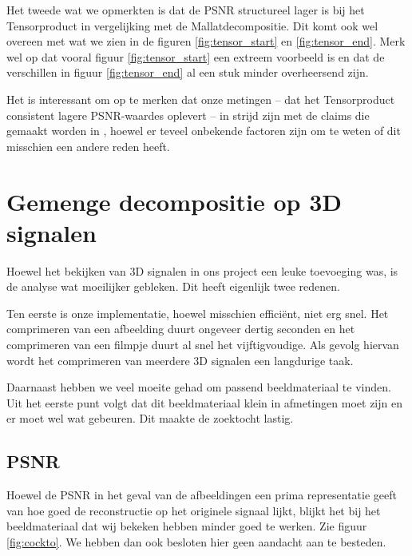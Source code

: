 Het tweede wat we opmerkten is dat de PSNR structureel lager is bij het Tensorproduct in vergelijking met de Mallatdecompositie. Dit komt ook wel overeen met wat we zien in de figuren \ref{fig:tensor_start} en \ref{fig:tensor_end}. Merk wel op dat vooral figuur \ref{fig:tensor_start} een extreem voorbeeld is en dat de verschillen in figuur \ref{fig:tensor_end} al een stuk minder overheersend zijn.

Het is interessant om op te merken dat onze metingen -- dat het Tensorproduct consistent lagere PSNR-waardes oplevert -- in strijd zijn met de claims die gemaakt worden in \cite{tensor_vs_mallat}, hoewel er teveel onbekende factoren zijn om te weten of dit misschien een andere reden heeft.
\section{Gemenge decompositie op 3D signalen}
Hoewel het bekijken van 3D signalen in ons project een leuke toevoeging was, is de analyse wat moeilijker gebleken. Dit heeft eigenlijk twee redenen.

Ten eerste is onze implementatie, hoewel misschien effici\"ent, niet erg snel. Het comprimeren van een afbeelding duurt ongeveer dertig seconden en het comprimeren van een filmpje duurt al snel het vijftigvoudige. Als gevolg hiervan wordt het comprimeren van meerdere 3D signalen een langdurige taak.

Daarnaast hebben we veel moeite gehad om passend beeldmateriaal te vinden. Uit het eerste punt volgt dat dit beeldmateriaal klein in afmetingen moet zijn en er moet wel wat gebeuren. Dit maakte de zoektocht lastig.

\subsection{PSNR}
Hoewel de PSNR in het geval van de afbeeldingen een prima representatie geeft van hoe goed de reconstructie op het originele signaal lijkt, blijkt het bij het beeldmateriaal dat wij bekeken hebben minder goed te werken. Zie figuur \ref{fig:cockto}. We hebben dan ook besloten hier geen aandacht aan te besteden.

